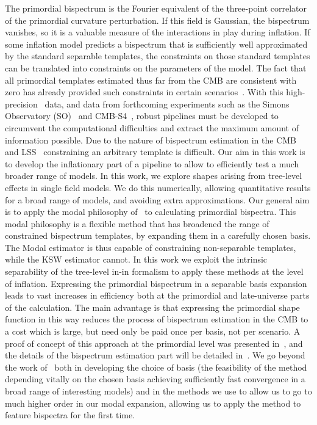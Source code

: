The primordial bispectrum is the Fourier equivalent of the
three-point correlator of the primordial curvature perturbation.
If this field is Gaussian, the bispectrum vanishes, so
it is a valuable measure of the interactions in play during inflation.
If some inflation model predicts a bispectrum that is sufficiently well approximated by
the standard separable templates, the constraints on those standard templates
can be translated into constraints on the parameters of the model.
The fact that all primordial templates estimated thus far from the CMB
are consistent with zero has already provided such constraints
in certain scenarios~\cite{Planck_NG_2015, Planck_NG_2018}.
With this high-precision \planck~data, and data from forthcoming experiments
such as the Simons Observatory (SO)~\cite{simons}
and CMB-S4~\cite{abazajian2016cmbs4},
robust pipelines must be developed to circumvent the computational difficulties and
extract the maximum amount of information possible.
Due to the nature of bispectrum estimation in the CMB and
LSS~\cite{lss_baldauf,lss_karagiannis,chen_future_lss,Scoccimarro_2012}
constraining an arbitrary template is difficult.
Our aim in this work is to develop the inflationary part
of a pipeline to allow to efficiently test a much broader range of models.
In this work, we explore shapes arising from tree-level effects in single field models.
We do this numerically, allowing quantitative results for a broad
range of models, and avoiding extra approximations.
Our general aim is to apply the modal philosophy of~\cite{FergShell_1,FergShell_2,FergShell_3}
to calculating primordial bispectra.
This modal philosophy is a flexible method that has broadened the range of constrained
bispectrum templates, by expanding them in a carefully chosen basis.
The Modal estimator is thus capable of constraining
non-separable templates, while the KSW estimator cannot.
In this work we exploit the intrinsic separability of the
tree-level in-in formalism to apply these methods at the level of inflation.
Expressing the primordial bispectrum in a separable
basis expansion leads to vast increases in efficiency both at the primordial
and late-universe parts of the calculation.
The main advantage is that expressing the primordial shape function
in this way reduces the process of bispectrum estimation in the CMB to a
cost which is large, but need only be paid once per basis,
not per scenario.
A proof of concept of this approach at the primordial level was presented in~\cite{Funakoshi},
and the details of the bispectrum estimation part will be detailed in~\cite{Sohn_2021}.
We go beyond the work of~\cite{Funakoshi} both in developing the choice of basis
(the feasibility of the method depending vitally on the chosen basis
achieving sufficiently fast convergence in a broad range of interesting models)
and in the methods we use to allow us to go to much higher order in our modal expansion,
allowing us to apply the method to feature bispectra for the first time.



